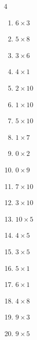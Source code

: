 \begin{multicols}{4}
\begin{enumerate}
  \item $6\times 3$
        \phantom{$=18$}

  \item $5\times 8$
        \phantom{$=40$}

\columnbreak %

\resetques

  \item $3\times 6$
        \phantom{$=18$}

  \item $4\times 1$
        \phantom{$=4$}

  \item $2\times 10$
        \phantom{$=20$}

  \item $1\times 10$
        \phantom{$=10$}

  \item $5\times 10$
        \phantom{$=50$}

  \item $1\times 7$
        \phantom{$=7$}

  \item $0\times 2$
        \phantom{$=0$}

  \item $0\times 9$
        \phantom{$=0$}

  \item $7\times 10$
        \phantom{$=70$}

  \item $3\times 10$
        \phantom{$=30$}

  \item $10\times 5$
        \phantom{$=50$}

  \item $4\times 5$
        \phantom{$=20$}

  \item $3\times 5$
        \phantom{$=15$}

  \item $5\times 1$
        \phantom{$=5$}

  \item $6\times 1$
        \phantom{$=6$}

  \item $4\times 8$
        \phantom{$=32$}

  \item $9\times 3$
        \phantom{$=27$}

  \item $9\times 5$
        \phantom{$=45$}


\end{enumerate}
\end{multicols}
